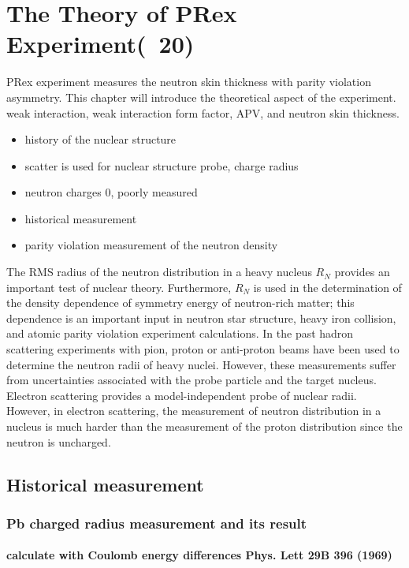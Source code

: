 \chapter{The Theory of PRex Experiment(~20)}



PRex experiment measures the neutron skin thickness with parity violation asymmetry. This chapter will introduce the theoretical aspect of the experiment. weak interaction, weak interaction form factor, APV, and neutron skin thickness.

\begin{itemize}
    \item history of the nuclear structure
    \item scatter is used for nuclear structure probe, charge radius 
    \item neutron charges 0, poorly measured
    \item historical measurement 
    \item parity violation measurement of the neutron density
\end{itemize}

The RMS radius of the  neutron distribution in a heavy nucleus  $R_N$ provides an important test of nuclear theory. Furthermore,   $R_N$ is used in the determination of  the density dependence of symmetry energy of neutron-rich matter; this dependence is an  important input in   neutron star structure, heavy iron collision, and atomic parity violation experiment calculations. In the past hadron scattering experiments with pion, proton or anti-proton beams have been used to determine the neutron radii of heavy nuclei. However, these measurements suffer from uncertainties associated with the probe particle and the target nucleus. Electron scattering provides a model-independent probe of nuclear radii.  However, in electron scattering, the measurement of neutron distribution in a nucleus  is much harder than the measurement of the proton distribution  since the neutron is uncharged. 


\section{Historical measurement}
\subsection{Pb charged radius measurement and its result}
\subsubsection{calculate with Coulomb energy differences Phys. Lett 29B 396 (1969)}
